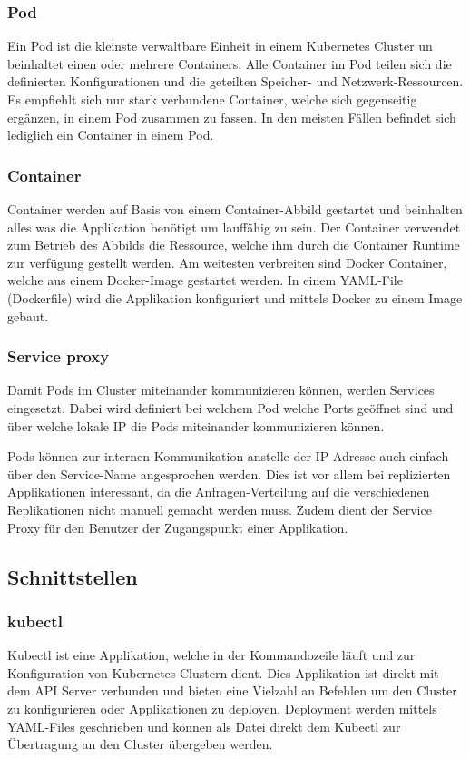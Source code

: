 \subsubsection{Pod}
Ein Pod ist die kleinste verwaltbare Einheit in einem Kubernetes Cluster un beinhaltet einen oder mehrere Containers. Alle Container im Pod teilen sich die definierten Konfigurationen und die geteilten Speicher- und Netzwerk-Ressourcen. Es empfiehlt sich nur stark verbundene Container, welche sich gegenseitig ergänzen, in einem Pod zusammen zu fassen. In den meisten Fällen befindet sich lediglich ein Container in einem Pod. \cite{kubernetes}
\subsubsection{Container}
Container werden auf Basis von einem Container-Abbild gestartet und beinhalten alles was die Applikation benötigt um lauffähig zu sein. Der Container verwendet zum Betrieb des Abbilds die Ressource, welche ihm durch die Container Runtime zur verfügung gestellt werden. Am weitesten verbreiten sind Docker Container, welche aus einem Docker-Image gestartet werden. In einem YAML-File (Dockerfile) wird die Applikation konfiguriert und mittels Docker zu einem Image gebaut.  \cite{kubernetes}
\subsubsection{Service proxy}
Damit Pods im Cluster miteinander kommunizieren können, werden Services eingesetzt. Dabei wird definiert bei welchem Pod welche Ports geöffnet sind und über welche lokale IP die Pods miteinander kommunizieren können.

Pods können zur internen Kommunikation anstelle der IP Adresse auch einfach über den Service-Name angesprochen werden. Dies ist vor allem bei replizierten Applikationen interessant, da die Anfragen-Verteilung auf die verschiedenen Replikationen nicht manuell gemacht werden muss. 
Zudem dient der Service Proxy für den Benutzer der Zugangspunkt einer Applikation.  \cite{kubernetes}

\subsection{Schnittstellen}
\subsubsection{kubectl}
Kubectl ist eine Applikation, welche in der Kommandozeile läuft und zur Konfiguration von Kubernetes Clustern dient. Dies Applikation ist direkt mit dem API Server verbunden und bieten eine Vielzahl an Befehlen um den Cluster zu konfigurieren oder Applikationen zu deployen. 
Deployment werden mittels YAML-Files geschrieben und können als Datei direkt dem Kubectl zur Übertragung an den Cluster übergeben werden. \cite{kubernetes}
